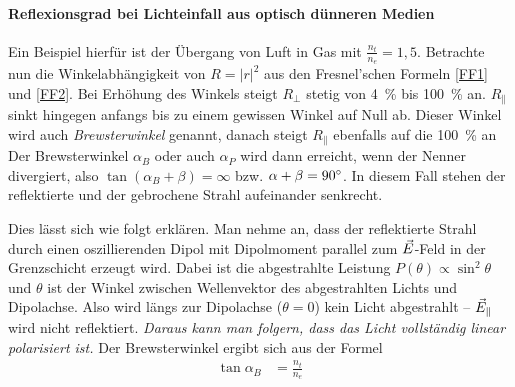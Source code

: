 \paragraph{Reflexionsgrad bei Lichteinfall aus optisch dünneren
  Medien}
Ein Beispiel hierfür ist der Übergang von Luft in Gas mit $\frac{n_t}{n_e}=1,5$.
Betrachte nun die Winkelabhängigkeit von $R=\vert r\vert^2$ aus den
Fresnel'schen Formeln \ref{FF1} und \ref{FF2}. 
Bei Erhöhung des Winkels steigt $R_{\bot}$ stetig von \SI{4}{\percent}
bis \SI{100}{\percent} an. 
$R_{\parallel}$ sinkt hingegen anfangs bis zu einem gewissen Winkel
auf Null ab. Dieser Winkel wird auch
\emph{Brewsterwinkel}%
%
genannt, danach steigt
$R_{\parallel}$ ebenfalls auf die \SI{100}{\percent} an 
Der Brewsterwinkel $\alpha_B$ oder auch $\alpha_P$ wird dann erreicht,
wenn der Nenner divergiert, also $\tan(\alpha_B+\beta)=\infty$
bzw. $\alpha+\beta=90\degree$. In diesem Fall stehen der reflektierte
und der gebrochene Strahl aufeinander senkrecht.

Dies lässt sich wie folgt erklären. Man nehme an, dass der
reflektierte Strahl durch einen oszillierenden Dipol mit Dipolmoment
parallel zum $\vec{E}$-Feld in der Grenzschicht erzeugt wird. Dabei ist
die abgestrahlte Leistung $P(\theta)\propto\sin^2\theta$ und $\theta$
ist der Winkel zwischen Wellenvektor des abgestrahlten Lichts und
Dipolachse. Also wird längs zur Dipolachse ($\theta=0$) kein Licht
abgestrahlt -- $\vec{E}_{\parallel}$ wird nicht reflektiert. 
\emph{Daraus kann man folgern, dass das Licht vollständig linear
  polarisiert ist.}
Der Brewsterwinkel ergibt sich aus der Formel
\begin{align*}
  \tan\alpha_B &= \frac{n_t}{n_e}
\end{align*}



